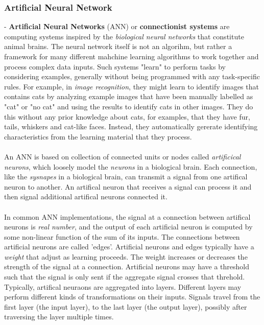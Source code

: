 \subsubsection{Artificial Neural Network}
- \textbf{Artificial Neural Networks} (ANN) or \textbf{connectionist systems} are computing systems inspired by the \textit{biological neural networks} that constitute animal brains. The neural network itself is not an algorihm, but rather a framework for many different mahchine learning algorithms to work together and process complex data inputs. Such systems "learn" to perform tasks by considering examples, generally without being programmed with any task-specific rules. For example, in \textit{image recognition}, they might learn to identify images that contains cats by analyzing example images that have been manually labelled as "cat" or "no cat" and using the results to identify cats in other images. They do this without any prior knowledge about cats, for examples, that they have fur, tails, whiskers and cat-like faces. Instead, they automatically gererate identifying characteristics from the learning material that they process.\\
\\
An ANN is based on collection of connected units or nodes called \textit{artificical neurons}, which loosely model the \textit{neurons} in a biological brain. Each connection, like the \textit{sysnapes} in a biological brain, can transmit a signal from one artifical neuron to another. An artifical neuron that receives a signal can process it and then signal additional artifical neurons connected it.\\
\\
In common ANN implementations, the signal at a connection between artifical neurons is \textit{real number}, and the output of each artificial neuron is computed by some non-linear function of the sum of its inputs. The connections between artificial neurons are called 'edges'. Artificial neurons and edges typically have a \textit{weight} that adjust as learning proceeds. The weight increases or decreases the strength of the signal at a connection. Artificial neurons may have a threshold such that the signal is only sent if the aggregate signal crosses that threhold. Typically, artifical neuraons are aggregated into layers. Different layers may perform different kinds of transformations on their inputs. Signals travel from the first layer (the input layer), to the last layer (the output layer), possibly after traversing 
the layer multiple times.\\
